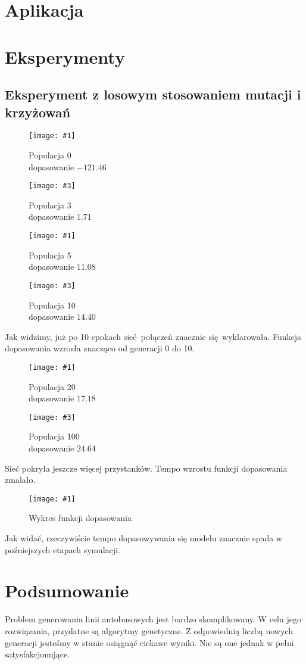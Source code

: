 \documentclass[12pt,a4paper,openright]{mwrep}
\newcommand{\imgcustomsize}[3]{
	\begin{figure}[H]
		\centering
		\texttt{[image: \#1]}
		\caption{#2}
	\end{figure}
}
\newcommand{\imgsidebyside}[4]{
	\begin{figure}[H]
		\centering
		\begin{minipage}{.45\textwidth}
			\centering
			\texttt{[image: \#1]}
			\caption{#2}
		\end{minipage}%
		\hfill
		\begin{minipage}{.45\textwidth}
			\centering
			\texttt{[image: \#3]}
			\caption{#4}
		\end{minipage}
	\end{figure}
}
\begin{document}
\chapter{Aplikacja}

\chapter{Eksperymenty}

\section{Eksperyment z losowym stosowaniem mutacji i krzyżowań}
\imgsidebyside{test1/0}{Populacja 0\\ dopasowanie $-121.46$}{test1/3}{Populacja 3\\ dopasowanie $1.71$}
\imgsidebyside{test1/5}{Populacja 5\\ dopasowanie $11.08$}{test1/10}{Populacja 10\\ dopasowanie $14.40$}
Jak widzimy, już po 10 epokach sieć połączeń znacznie się wyklarowała. Funkcja dopasowania wzrosła znacząco od generacji 0 do 10.

\imgsidebyside{test1/20}{Populacja 20\\ dopasowanie $17.18$}{test1/100}{Populacja 100\\ dopasowanie $24.64$}
Sieć pokryła jeszcze więcej przystanków. Tempo wzrostu funkcji dopasowania zmalało.

\imgcustomsize{test1/plot}{Wykres funkcji dopasowania}{0.6}
Jak widać, rzeczywiście tempo dopasowywania się modelu znacznie spada w poźniejszych etapach symulacji.

\chapter{Podsumowanie}

Problem generowania linii autobusowych jest bardzo skomplikowany. W celu jego rozwiązania, przydatne są algorytmy genetyczne. Z odpowiednią liczbą nowych generacji jesteśmy w stanie osiągnąć ciekawe wyniki. Nie są one jednak w pełni satysfakcjonujące.
\end{document}
